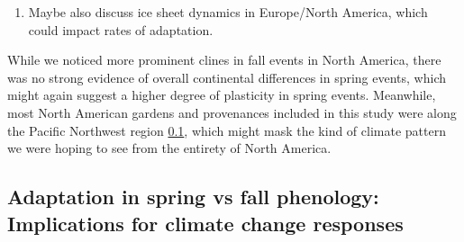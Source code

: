 \documentclass{article}
\begin{document}
\begin{enumerate}
\item Maybe also discuss ice sheet dynamics in Europe/North America, which could impact rates of adaptation.
\end{enumerate}
While we noticed more prominent clines in fall events in North America, there was no strong evidence of overall continental differences in spring events, which might again suggest a higher degree of plasticity in spring events. Meanwhile, most North American gardens and provenances included in this study were along the Pacific Northwest region \ref{}, which might mask the kind of climate pattern we were hoping to see from the entirety of North America.  %

\subsection{Adaptation in spring vs fall phenology: Implications for climate change responses}
\end{document}
